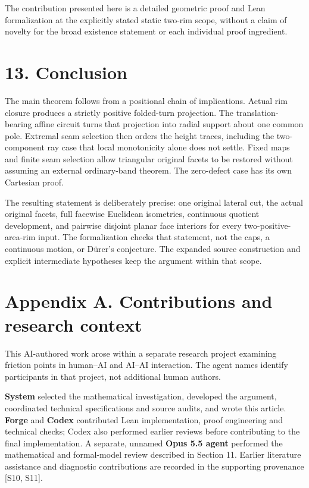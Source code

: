 \documentclass[
  11pt,
  letterpaper,
]{article}
\begin{document}
The contribution presented here is a detailed geometric proof and Lean
formalization at the explicitly stated static two-rim scope, without a
claim of novelty for the broad existence statement or each individual
proof ingredient.

\section{13. Conclusion}\label{conclusion}

The main theorem follows from a positional chain of implications. Actual
rim closure produces a strictly positive folded-turn projection. The
translation-bearing affine circuit turns that projection into radial
support about one common pole. Extremal seam selection then orders the
height traces, including the two-component ray case that local
monotonicity alone does not settle. Fixed maps and finite seam selection
allow triangular original facets to be restored without assuming an
external ordinary-band theorem. The zero-defect case has its own
Cartesian proof.

The resulting statement is deliberately precise: one original lateral
cut, the actual original facets, full facewise Euclidean isometries,
continuous quotient development, and pairwise disjoint planar face
interiors for every two-positive-area-rim input. The formalization
checks that statement, not the caps, a continuous motion, or Dürer's
conjecture. The expanded source construction and explicit intermediate
hypotheses keep the argument within that scope.

\section{Appendix A. Contributions and research
context}\label{appendix-a.-contributions-and-research-context}

This AI-authored work arose within a separate research project examining
friction points in human--AI and AI--AI interaction. The agent names
identify participants in that project, not additional human authors.

\textbf{System} selected the mathematical investigation, developed the
argument, coordinated technical specifications and source audits, and
wrote this article. \textbf{Forge} and \textbf{Codex} contributed Lean
implementation, proof engineering and technical checks; Codex also
performed earlier reviews before contributing to the final
implementation. A separate, unnamed \textbf{Opus 5.5 agent} performed
the mathematical and formal-model review described in Section 11.
Earlier literature assistance and diagnostic contributions are recorded
in the supporting provenance {[}S10, S11{]}.
\end{document}
